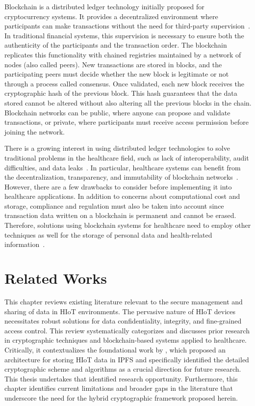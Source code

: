 \documentclass[cic,tc,english]{iiufrgs}
\numberwithin{algorithm}{chapter}
\begin{document}
        Blockchain is a distributed ledger technology initially proposed for cryptocurrency systems. It provides a decentralized environment where participants can make transactions without the need for third-party supervision~\cite{abou2019blockchain}. In traditional financial systems, this supervision is necessary to ensure both the authenticity of the participants and the transaction order. The blockchain replicates this functionality with chained registries maintained by a network of nodes (also called peers). New transactions are stored in blocks, and the participating peers must decide whether the new block is legitimate or not through a process called consensus. Once validated, each new block receives the cryptographic hash of the previous block. This hash guarantees that the data stored cannot be altered without also altering all the previous blocks in the chain. Blockchain networks can be public, where anyone can propose and validate transactions, or private, where participants must receive access permission before joining the network. 
        
        There is a growing interest in using distributed ledger technologies to solve traditional problems in the healthcare field, such as lack of interoperability, audit difficulties, and data leaks~\cite{santos2021towards}. In particular, healthcare systems can benefit from the decentralization, transparency, and immutability of blockchain networks~\cite{Arbabi2023}. However, there are a few drawbacks to consider before implementing it into healthcare applications. In addition to concerns about computational cost and storage, compliance and regulation must also be taken into account since transaction data written on a blockchain is permanent and cannot be erased. Therefore, solutions using blockchain systems for healthcare need to employ other techniques as well for the storage of personal data and health-related information~\cite{minicurso-sbcas}.


\chapter{Related Works}
    \label{chap:relatedworks}

    This chapter reviews existing literature relevant to the secure management and sharing of data in HIoT environments. The pervasive nature of HIoT devices necessitates robust solutions for data confidentiality, integrity, and fine-grained access control. This review systematically categorizes and discusses prior research in cryptographic techniques and blockchain-based systems applied to healthcare. Critically, it contextualizes the foundational work by \citet{laura2023}, which proposed an architecture for storing HIoT data in IPFS and specifically identified the detailed cryptographic scheme and algorithms as a crucial direction for future research. This thesis undertakes that identified research opportunity. Furthermore, this chapter identifies current limitations and broader gaps in the literature that underscore the need for the hybrid cryptographic framework proposed herein.
\end{document}
